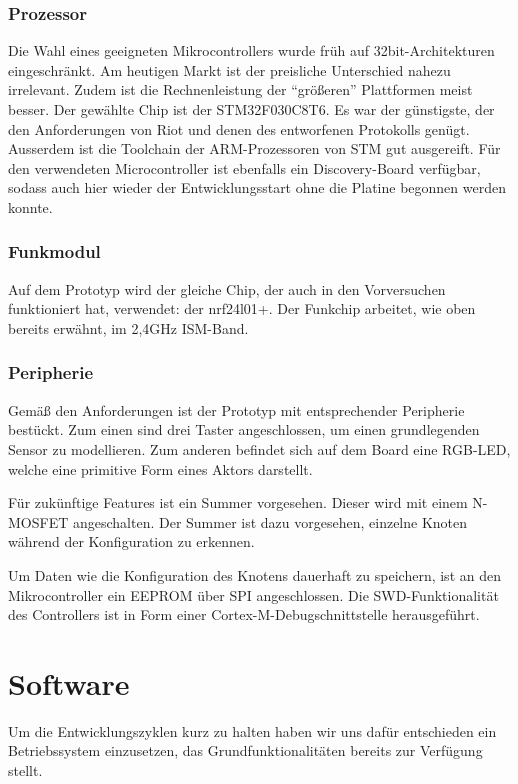 \documentclass{IEEEtran}
\begin{document}
\subsubsection{Prozessor}
Die Wahl eines geeigneten Mikrocontrollers wurde früh auf 32bit-Architekturen eingeschränkt. Am heutigen Markt ist der preisliche Unterschied nahezu irrelevant. Zudem ist die Rechnenleistung der \enquote{größeren} Plattformen meist besser. Der gewählte Chip ist der STM32F030C8T6. Es war der günstigste, der den Anforderungen von Riot und denen des entworfenen Protokolls genügt. Ausserdem ist die Toolchain der ARM-Prozessoren von STM gut ausgereift.
Für den verwendeten Microcontroller ist ebenfalls ein Discovery-Board verfügbar, sodass auch hier wieder der Entwicklungsstart ohne die Platine begonnen werden konnte.

\subsubsection{Funkmodul}
Auf dem Prototyp wird der gleiche Chip, der auch in den Vorversuchen funktioniert hat, verwendet: der nrf24l01+. Der Funkchip arbeitet, wie oben bereits erwähnt, im 2,4GHz ISM-Band.

\subsubsection{Peripherie}
Gemäß den Anforderungen ist der Prototyp mit entsprechender Peripherie bestückt.
Zum einen sind drei Taster angeschlossen, um einen grundlegenden Sensor zu modellieren.
Zum anderen befindet sich auf dem Board eine RGB-LED, welche eine primitive Form eines Aktors darstellt.

Für zukünftige Features ist ein Summer vorgesehen.
Dieser wird mit einem N-MOSFET angeschalten.
Der Summer ist dazu vorgesehen, einzelne Knoten während der Konfiguration zu erkennen.

Um Daten wie die Konfiguration des Knotens dauerhaft zu speichern, ist an den Mikrocontroller ein EEPROM über SPI angeschlossen.
Die SWD-Funktionalität des Controllers ist in Form einer Cortex-M-Debugschnittstelle herausgeführt.


\section{Software}
    Um die Entwicklungszyklen kurz zu halten haben wir uns dafür entschieden
    ein Betriebssystem einzusetzen, das Grundfunktionalitäten bereits
    zur Verfügung stellt.
\end{document}
